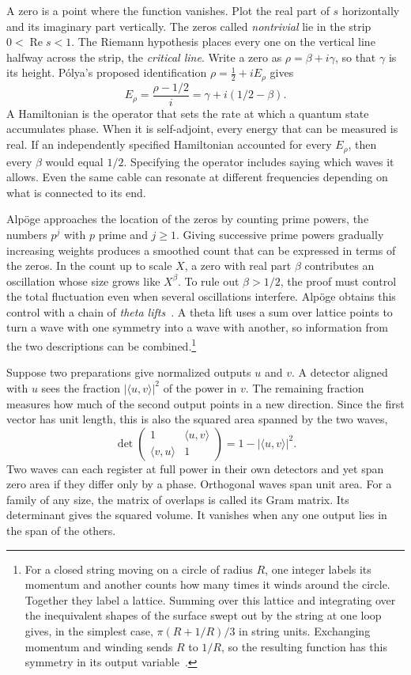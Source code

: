 \documentclass[11pt,letterpaper]{article}
\numberwithin{equation}{section}
\begin{document}
A zero is a point where the function vanishes. Plot the real part of $s$ horizontally and its imaginary part vertically. The zeros called \emph{nontrivial} lie in the strip $0<\operatorname{Re}s<1$. The Riemann hypothesis places every one on the vertical line halfway across the strip, the \emph{critical line}. Write a zero as $\rho=\beta+i\gamma$, so that $\gamma$ is its height. P\'olya's proposed identification $\rho=\tfrac12+iE_\rho$ gives
\[
 E_\rho=\frac{\rho-1/2}{i}=\gamma+i(1/2-\beta).
\]
A Hamiltonian is the operator that sets the rate at which a quantum state accumulates phase. When it is self-adjoint, every energy that can be measured is real. If an independently specified Hamiltonian accounted for every $E_\rho$, then every $\beta$ would equal $1/2$. Specifying the operator includes saying which waves it allows. Even the same cable can resonate at different frequencies depending on what is connected to its end.

Alp\"oge approaches the location of the zeros by counting prime powers, the numbers $p^j$ with $p$ prime and $j\ge1$. Giving successive prime powers gradually increasing weights produces a smoothed count that can be expressed in terms of the zeros. In the count up to scale $X$, a zero with real part $\beta$ contributes an oscillation whose size grows like $X^\beta$. To rule out $\beta>1/2$, the proof must control the total fluctuation even when several oscillations interfere. Alp\"oge obtains this control with a chain of \emph{theta lifts}~\cite{alpoge,sutherland,primeinput}. A theta lift uses a sum over lattice points to turn a wave with one symmetry into a wave with another, so information from the two descriptions can be combined.\footnote{For a closed string moving on a circle of radius $R$, one integer labels its momentum and another counts how many times it winds around the circle. Together they label a lattice. Summing over this lattice and integrating over the inequivalent shapes of the surface swept out by the string at one loop gives, in the simplest case, $\pi(R+1/R)/3$ in string units. Exchanging momentum and winding sends $R$ to $1/R$, so the resulting function has this symmetry in its output variable~\cite[\S3.2]{stringlift}.}

Suppose two preparations give normalized outputs $u$ and $v$. A detector aligned with $u$ sees the fraction $|\langle u,v\rangle|^2$ of the power in $v$. The remaining fraction measures how much of the second output points in a new direction. Since the first vector has unit length, this is also the squared area spanned by the two waves,
\[
 \det\!\begin{pmatrix}1&\langle u,v\rangle\\
                        \langle v,u\rangle&1\end{pmatrix}
       =1-|\langle u,v\rangle|^2 .
\]
Two waves can each register at full power in their own detectors and yet span zero area if they differ only by a phase. Orthogonal waves span unit area. For a family of any size, the matrix of overlaps is called its Gram matrix. Its determinant gives the squared volume. It vanishes when any one output lies in the span of the others.
\end{document}
